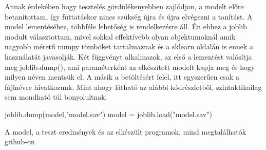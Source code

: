 Annak érdekében hogy tesztelés gördülékenyebben zajlódjon, a modelt előre betanítottam, így futtatáskor nincs szükség újra és újra elvégezni a tanítást.
A model lementéséhez, többféle lehetőség is rendelkezésre áll. Én ehhez a joblib modult választottam, mivel sokkal effektívebb olyan objektumoknál amik nagyobb méretű numpy tömböket tartalmaznak és a sklearn oldalán is ennek a használatát javasolják.
Két függvényt alkalmazok, az első a lementést valósítja meg joblib.dump(), ami paraméterként az elkészített modelt kapja meg és hogy milyen néven mentsük el.
A másik a betöltésért felel, itt egyszerűen csak a fájlnévre hivatkozunk.
Mint ahogy látható az alábbi kódrészletből, szintaktikailag sem mondható túl bonyolultnak.

\begin{python}
joblib.dump(model,"model.sav") 
model = joblib.load("model.sav") 
\end{python}
A model, a teszt eredmények és az elkészült programok, mind megtalálhatók github-on

